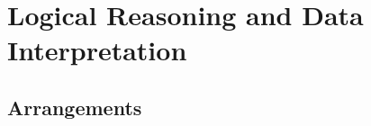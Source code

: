 \documentclass{book}
\begin{document}
% 



\part{Logical Reasoning and Data Interpretation}

\chapter{Arrangements}





% 

\end{document}
